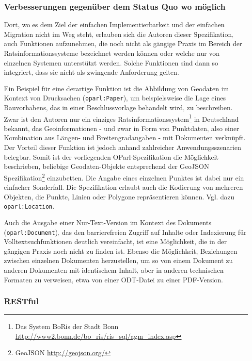 \documentclass[,a4paper]{article}
\begin{document}
\subsubsection{Verbesserungen gegenüber dem Status Quo wo möglich}

Dort, wo es dem Ziel der einfachen Implementierbarkeit und der einfachen
Migration nicht im Weg steht, erlauben sich die Autoren dieser
Spezifikation, auch Funktionen aufzunehmen, die noch nicht als gängige
Praxis im Bereich der Ratsinformationssysteme bezeichnet werden können
oder welche nur von einzelnen Systemen unterstützt werden. Solche
Funktionen sind dann so integriert, dass sie nicht als zwingende
Anforderung gelten.

Ein Beispiel für eine derartige Funktion ist die Abbildung von Geodaten
im Kontext von Drucksachen (\texttt{oparl:Paper}), um beispielsweise die
Lage eines Bauvorhabens, das in einer Beschlussvorlage behandelt wird,
zu beschreiben. Zwar ist den Autoren nur ein einziges
Ratsinformationssystem\footnote{Das System BoRis der Stadt Bonn
  \url{http://www2.bonn.de/bo_ris/ris_sql/agm_index.asp}} in Deutschland
bekannt, das Geoinformationen - und zwar in Form von Punktdaten, also
einer Kombination aus Längen- und Breitengradangaben - mit Dokumenten
verknüpft. Der Vorteil dieser Funktion ist jedoch anhand zahlreicher
Anwendungsszenarien belegbar. Somit ist der vorliegenden
OParl-Spezifikation die Möglichkeit beschrieben, beliebige
Geodaten-Objekte entsprechend der GeoJSON Spezifikation\footnote{GeoJSON
  \url{http://geojson.org/}} einzubetten. Die Angabe eines einzelnen
Punktes ist dabei nur ein einfacher Sonderfall. Die Spezifikation
erlaubt auch die Kodierung von mehreren Objekten, die Punkte, Linien
oder Polygone repräsentieren können. Vgl. dazu \texttt{oparl:Location}.

Auch die Ausgabe einer Nur-Text-Version im Kontext des Dokuments
(\texttt{oparl:Document}), das den barrierefreien Zugriff auf Inhalte
oder Indexierung für Volltextsuchfunktionen deutlich vereinfacht, ist
eine Möglichkeit, die in der gängigen Praxis noch nicht zu finden ist.
Ebenso die Möglichkeit, Beziehungen zwischen einzelnen Dokumenten
herzustellen, um so von einem Dokument zu anderen Dokumenten mit
identischem Inhalt, aber in anderen technischen Formaten zu verweisen,
etwa von einer ODT-Datei zu einer PDF-Version.

\subsubsection{RESTful}
\end{document}
